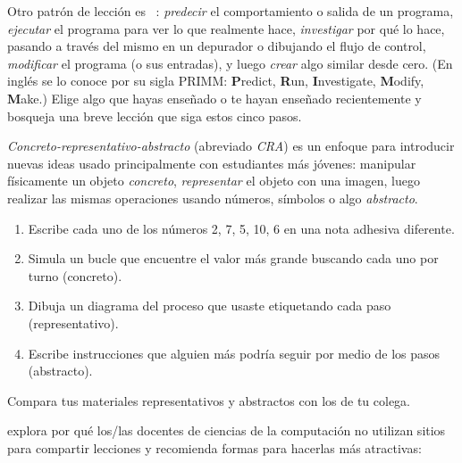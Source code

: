 
Otro patrón de lección es ~\cite{Sent2019}:
\emph{predecir} el comportamiento o salida de un programa,
\emph{ejecutar} el programa para ver lo que realmente hace,
\emph{investigar} por qué lo hace, pasando a través del mismo en un depurador o dibujando el flujo de control,
\emph{modificar} el programa (o sus entradas),
y luego \emph{crear} algo similar desde cero.
(En inglés se lo conoce por su sigla PRIMM: 
\textbf{P}redict, \textbf{R}un, \textbf{I}nvestigate, \textbf{M}odify, \textbf{M}ake.)
Elige algo que hayas enseñado o te hayan enseñado recientemente
y bosqueja una breve lección que siga estos cinco pasos.
 
 
 
{\emph{Concreto-representativo-abstracto}} (abreviado \emph{CRA}) es un enfoque para introducir nuevas ideas
usado principalmente con estudiantes más jóvenes:
manipular físicamente un objeto \emph{concreto},
\emph{representar} el objeto con una imagen,
luego realizar las mismas operaciones
usando números, símbolos o algo \emph{abstracto}.
 \begin{enumerate}
 
\item
  Escribe cada uno de los números 2, 7, 5, 10, 6 en una nota adhesiva diferente.
 
\item
  Simula un bucle que encuentre el valor más grande buscando cada uno por turno (concreto).
 
\item
 Dibuja un diagrama del proceso que usaste etiquetando cada paso (representativo).
 
\item
  Escribe instrucciones que alguien más podría seguir por medio de los pasos (abstracto).
\end{enumerate}
 
 
Compara tus materiales representativos y abstractos con los de tu colega.
 
 
\cite{Leak2017} explora por qué los/las docentes de ciencias de la computación
no utilizan sitios para compartir lecciones y recomienda formas para hacerlas más atractivas:
 

